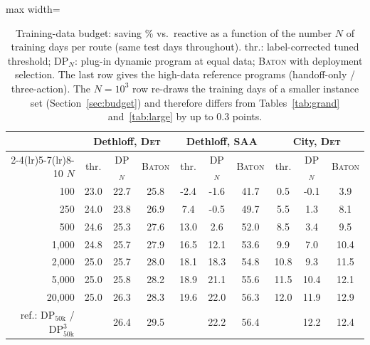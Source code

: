 \begin{table}[t]
\caption{Training-data budget: saving \% vs.\ reactive as a function of
the number $N$ of training days per route (same test days throughout).
thr.: label-corrected tuned threshold; DP$_N$: plug-in dynamic program
at equal data; \textsc{Baton} with deployment selection. The last row
gives the high-data reference programs (handoff-only / three-action).
The $N = 10^3$ row re-draws the training days of a smaller instance set
(Section~\ref{sec:budget}) and therefore differs from
Tables~\ref{tab:grand} and~\ref{tab:large} by up to 0.3 points.}
\label{tab:budget}
\centering
\footnotesize
\setlength{\tabcolsep}{3.5pt}
\begin{adjustbox}{max width=\linewidth}
\begin{tabular}{r ccc ccc ccc}
\toprule
& \multicolumn{3}{c}{Dethloff, \textsc{Det}} & \multicolumn{3}{c}{Dethloff, \textsc{SAA}} & \multicolumn{3}{c}{City, \textsc{Det}} \\ \cmidrule(lr){2-4}\cmidrule(lr){5-7}\cmidrule(lr){8-10}
$N$ & thr. & DP$_N$ & \textsc{Baton} & thr. & DP$_N$ & \textsc{Baton} & thr. & DP$_N$ & \textsc{Baton} \\
\midrule
100 & 23.0 & 22.7 & 25.8 & -2.4 & -1.6 & 41.7 & 0.5 & -0.1 & 3.9 \\
250 & 24.0 & 23.8 & 26.9 & 7.4 & -0.5 & 49.7 & 5.5 & 1.3 & 8.1 \\
500 & 24.6 & 25.3 & 27.6 & 13.0 & 2.6 & 52.0 & 8.5 & 3.4 & 9.5 \\
1{,}000 & 24.8 & 25.7 & 27.9 & 16.5 & 12.1 & 53.6 & 9.9 & 7.0 & 10.4 \\
2{,}000 & 25.0 & 25.7 & 28.0 & 18.1 & 18.3 & 54.8 & 10.8 & 9.3 & 11.5 \\
5{,}000 & 25.0 & 25.8 & 28.2 & 18.9 & 21.1 & 55.6 & 11.5 & 10.4 & 12.1 \\
20{,}000 & 25.0 & 26.3 & 28.3 & 19.6 & 22.0 & 56.3 & 12.0 & 11.9 & 12.9 \\
\midrule
ref.: DP$_{50\mathrm{k}}$ / DP$^3_{50\mathrm{k}}$ &  & 26.4 & 29.5 &  & 22.2 & 56.4 &  & 12.2 & 12.4 \\
\bottomrule
\end{tabular}
\end{adjustbox}
\end{table}
